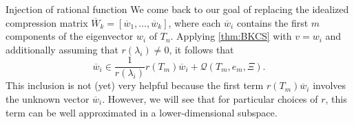 \documentclass{siamart190516}
\begin{document}
\begin{paragraph}{Injection of rational function}
We come back to our goal of replacing the idealized compression matrix $\overline{W}_{k} = [ \overline{w}_{1}, \ldots, \overline{w}_{k} ]$, where each 
$\overline{w}_{i}$ contains the first $m$ components of the 
eigenvector $w_{i}$ of $T_{n}$. Applying \cref{thm:BKCS} with $v = w_i$ and additionally assuming that $r(\lambda_{i})\neq 0$, it follows that
\begin{equation} \label{eq:formulabarwi}
    \overline{w}_{i} \in \frac{1}{r(\lambda_{i})} r(T_{m})\overline{w}_{i} + \mathcal{Q}(T_{m},e_m,\Xi).
\end{equation}
This inclusion is not (yet) very helpful because the first term $r(T_{m})\overline{w}_{i}$ involves the unknown vector $\overline{w}_{i}$.
However, we will see that for particular choices of $r$, this term can be well approximated in a lower-dimensional subspace.
\end{paragraph}
\end{document}
